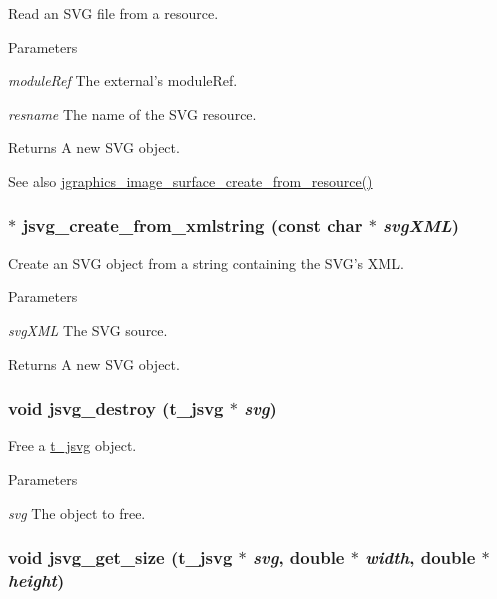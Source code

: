 Read an SVG file from a resource. 
\begin{DoxyParams}{Parameters}
\item[{\em moduleRef}]The external's moduleRef. \item[{\em resname}]The name of the SVG resource. \end{DoxyParams}
\begin{DoxyReturn}{Returns}
A new SVG object. 
\end{DoxyReturn}
\begin{DoxySeeAlso}{See also}
\hyperlink{group__jsurface_gabb5d09a9d36912e1685bad2799992117}{jgraphics\_\-image\_\-surface\_\-create\_\-from\_\-resource()} 
\end{DoxySeeAlso}
\hypertarget{group__jsvg_gae8173348a7e250c0e762438a75dacee3}{
\subsubsection[{jsvg\_\-create\_\-from\_\-xmlstring}]{$\ast$ jsvg\_\-create\_\-from\_\-xmlstring (const char $\ast$ {\em svgXML})}}
\label{group__jsvg_gae8173348a7e250c0e762438a75dacee3}


Create an SVG object from a string containing the SVG's XML. 
\begin{DoxyParams}{Parameters}
\item[{\em svgXML}]The SVG source. \end{DoxyParams}
\begin{DoxyReturn}{Returns}
A new SVG object. 
\end{DoxyReturn}
\hypertarget{group__jsvg_ga4b65c02fa6c10d1a9c6260ec1b30e453}{
\subsubsection[{jsvg\_\-destroy}]{\setlength{\rightskip}{0pt plus 5cm}void jsvg\_\-destroy ({\bf t\_\-jsvg} $\ast$ {\em svg})}}
\label{group__jsvg_ga4b65c02fa6c10d1a9c6260ec1b30e453}


Free a \hyperlink{group__jgraphics_gaa3000c3aa85e3d7c87f59c44d5d7ccab}{t\_\-jsvg} object. 
\begin{DoxyParams}{Parameters}
\item[{\em svg}]The object to free. \end{DoxyParams}
\hypertarget{group__jsvg_ga84eaba3340526cf8984bb8354993304f}{
\subsubsection[{jsvg\_\-get\_\-size}]{\setlength{\rightskip}{0pt plus 5cm}void jsvg\_\-get\_\-size ({\bf t\_\-jsvg} $\ast$ {\em svg}, \/  double $\ast$ {\em width}, \/  double $\ast$ {\em height})}}
\label{group__jsvg_ga84eaba3340526cf8984bb8354993304f}


